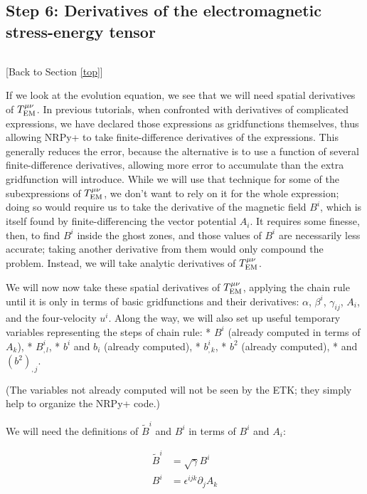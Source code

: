 \documentclass[landscape,letterpaper,10pt,english]{article}
\begin{document}
    \subsection{Step 6: Derivatives of the electromagnetic stress-energy
tensor}\label{step-6-derivatives-of-the-electromagnetic-stress-energy-tensor}

\[\label{step6}\]

{[}Back to Section \ref{top}{]}

If we look at the evolution equation, we see that we will need spatial
derivatives of \(T^{\mu\nu}_{\rm EM}\). In previous tutorials, when
confronted with derivatives of complicated expressions, we have declared
those expressions as gridfunctions themselves, thus allowing NRPy+ to
take finite-difference derivatives of the expressions. This generally
reduces the error, because the alternative is to use a function of
several finite-difference derivatives, allowing more error to accumulate
than the extra gridfunction will introduce. While we will use that
technique for some of the subexpressions of \(T^{\mu\nu}_{\rm EM}\), we
don't want to rely on it for the whole expression; doing so would
require us to take the derivative of the magnetic field \(B^i\), which
is itself found by finite-differencing the vector potential \(A_i\). It
requires some finesse, then, to find \(B^i\) inside the ghost zones, and
those values of \(B^i\) are necessarily less accurate; taking another
derivative from them would only compound the problem. Instead, we will
take analytic derivatives of \(T^{\mu\nu}_{\rm EM}\).

We will now now take these spatial derivatives of
\(T^{\mu\nu}_{\rm EM}\), applying the chain rule until it is only in
terms of basic gridfunctions and their derivatives: \(\alpha\),
\(\beta^i\), \(\gamma_{ij}\), \(A_i\), and the four-velocity \(u^i\).
Along the way, we will also set up useful temporary variables
representing the steps of chain rule: * \(B^i\) (already computed in
terms of \(A_k\)), * \(B^i_{,l}\), * \(b^i\) and \(b_i\) (already
computed), * \(b^i_{,k}\), * \(b^2\) (already computed), * and
\(\left(b^2\right)_{,j}\).

(The variables not already computed will not be seen by the ETK; they
simply help to organize the NRPy+ code.)

We will need the definitions of \(\tilde{B}^i\) and \(B^i\) in terms of
\(B^i\) and \(A_i\):

\begin{align}
\tilde{B}^i &= \sqrt{\gamma} B^i \\
B^i &= \epsilon^{ijk} \partial_j A_k \\
\end{align}
\end{document}
